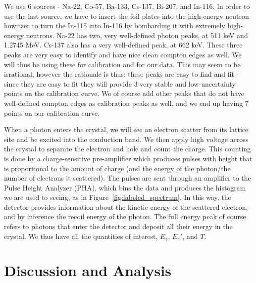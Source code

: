 \documentclass[reprint, nobibnotes, amssymb, amsmath, amsfonts, physics, mathtools, mathrsfs, floatfix]{revtex4-1}
\begin{document}
    \hspace{.25cm}

    We use 6 sources - Na-22, Co-57, Ba-133, Cs-137, Bi-207, and In-116.  In order to use the last source, we have to insert the foil plates into the high-energy neutron howitzer to turn the In-115 into In-116 by bombarding it with extremely high-energy neutrons.  Na-22 has two, very well-defined photon peaks, at 511 keV and 1.2745 MeV.  Cs-137 also has a very well-defined peak, at 662 keV.  These three peaks are very easy to identify and have nice clean compton edges as well.  We will thus be using these for calibration and for our data.  This may seem to be irrational, however the rationale is thus: these peaks are easy to find and fit - since they are easy to fit they will provide 3 very stable and low-uncertainty points on the calibration curve.  We of course add other peaks that do not have well-defined compton edges as calibration peaks as well, and we end up having 7 points on our calibration curve.

    \hspace{.25cm}

    When a photon enters the crystal, we will see an electron scatter from its lattice site and be excited into the conduction band.  We then apply high voltage across the crystal to separate the electron and hole and count the charge.  This counting is done by a charge-sensitive pre-amplifier which produces pulses with height that is proportional to the amount of charge (and the energy of the photon/the number of electrons it scattered).  The pulses are sent through an amplifier to the Pulse Height Analyzer (PHA), which bins the data and produces the histogram we are used to seeing, as in Figure~\ref{fig:labeled_spectrum}.  In this way, the detector provides information about the kinetic energy of the scattered electron, and by inference the recoil energy of the photon.  The full energy peak of course refers to photons that enter the detector and deposit all their energy in the crystal.  We thus have all the quantities of interest, $E_\gamma$, $E_\gamma'$, and $T$.

  \section{Discussion and Analysis}
\end{document}
